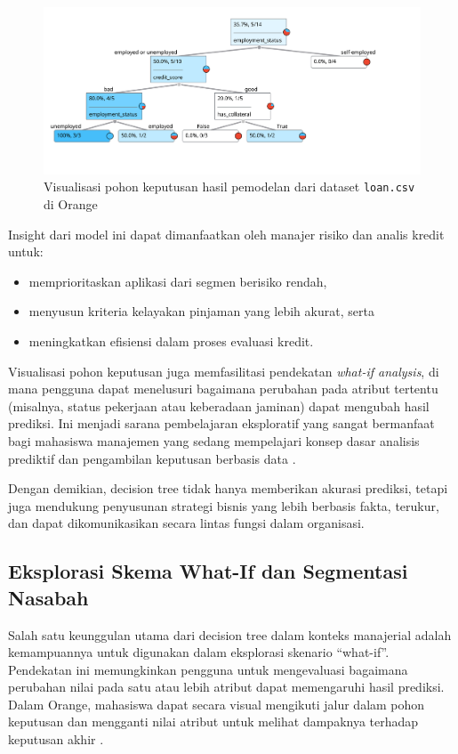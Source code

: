 \begin{figure}[h]
	\centering
	\includegraphics[width=\linewidth]{../figures/loan_tree.png}
	\caption{Visualisasi pohon keputusan hasil pemodelan dari dataset \texttt{loan.csv} di Orange}
	\label{fig:loan-tree}
\end{figure}

Insight dari model ini dapat dimanfaatkan oleh manajer risiko dan analis kredit untuk:
\begin{itemize}
	\item memprioritaskan aplikasi dari segmen berisiko rendah,
	\item menyusun kriteria kelayakan pinjaman yang lebih akurat, serta
	\item meningkatkan efisiensi dalam proses evaluasi kredit.
\end{itemize}

Visualisasi pohon keputusan juga memfasilitasi pendekatan \textit{what-if analysis}, di mana pengguna dapat menelusuri bagaimana perubahan pada atribut tertentu (misalnya, status pekerjaan atau keberadaan jaminan) dapat mengubah hasil prediksi. Ini menjadi sarana pembelajaran eksploratif yang sangat bermanfaat bagi mahasiswa manajemen yang sedang mempelajari konsep dasar analisis prediktif dan pengambilan keputusan berbasis data \cite{demsar2013orange}.

Dengan demikian, decision tree tidak hanya memberikan akurasi prediksi, tetapi juga mendukung penyusunan strategi bisnis yang lebih berbasis fakta, terukur, dan dapat dikomunikasikan secara lintas fungsi dalam organisasi.


\subsection{Eksplorasi Skema What-If dan Segmentasi Nasabah}

Salah satu keunggulan utama dari decision tree dalam konteks manajerial adalah kemampuannya untuk digunakan dalam eksplorasi skenario “what-if”. Pendekatan ini memungkinkan pengguna untuk mengevaluasi bagaimana perubahan nilai pada satu atau lebih atribut dapat memengaruhi hasil prediksi. Dalam Orange, mahasiswa dapat secara visual mengikuti jalur dalam pohon keputusan dan mengganti nilai atribut untuk melihat dampaknya terhadap keputusan akhir \cite{demsar2013orange}.

